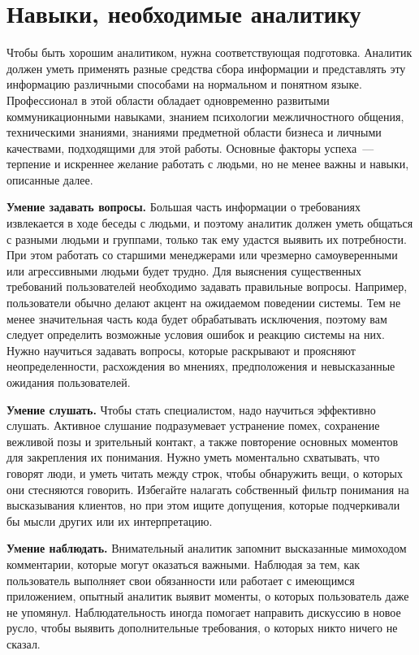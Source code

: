 \documentclass{../../text-style}
\begin{document}
\section{Навыки, необходимые аналитику}

Чтобы быть хорошим аналитиком, нужна соответствующая подготовка. Аналитик должен уметь применять разные средства сбора информации и представлять эту информацию различными способами на нормальном и понятном языке. Профессионал в этой области обладает одновременно развитыми коммуникационными навыками, знанием психологии межличностного общения, техническими знаниями, знаниями предметной области бизнеса и личными качествами, подходящими для этой работы. Основные факторы успеха~--- терпение и искреннее желание работать с людьми, но не менее важны и навыки, описанные далее.

\textbf{Умение задавать вопросы.} Большая часть информации о требованиях извлекается в ходе беседы с людьми, и поэтому аналитик должен уметь общаться с разными людьми и группами, только так ему удастся выявить их потребности. При этом работать со старшими менеджерами или чрезмерно самоуверенными или агрессивными людьми будет трудно. Для выяснения существенных требований пользователей необходимо задавать правильные вопросы. Например, пользователи обычно делают акцент на ожидаемом поведении системы. Тем не менее значительная часть кода будет обрабатывать исключения, поэтому вам следует определить возможные условия ошибок и реакцию системы на них. Нужно научиться задавать вопросы, которые раскрывают и проясняют неопределенности, расхождения во мнениях, предположения и невысказанные ожидания пользователей.

\textbf{Умение слушать.} Чтобы стать специалистом, надо научиться эффективно слушать. Активное слушание подразумевает устранение помех, сохранение вежливой позы и зрительный контакт, а также повторение основных моментов для закрепления их понимания. Нужно уметь моментально схватывать, что говорят люди, и уметь читать между строк, чтобы обнаружить вещи, о которых они стесняются говорить. Избегайте налагать собственный фильтр понимания на высказывания клиентов, но при этом ищите допущения, которые подчеркивали бы мысли других или их интерпретацию.

\textbf{Умение наблюдать.} Внимательный аналитик запомнит высказанные мимоходом комментарии, которые могут оказаться важными. Наблюдая за тем, как пользователь выполняет свои обязанности или работает с имеющимся приложением, опытный аналитик выявит моменты, о которых пользователь даже не упомянул. Наблюдательность иногда помогает направить дискуссию в новое русло, чтобы выявить дополнительные требования, о которых никто ничего не сказал.
\end{document}
